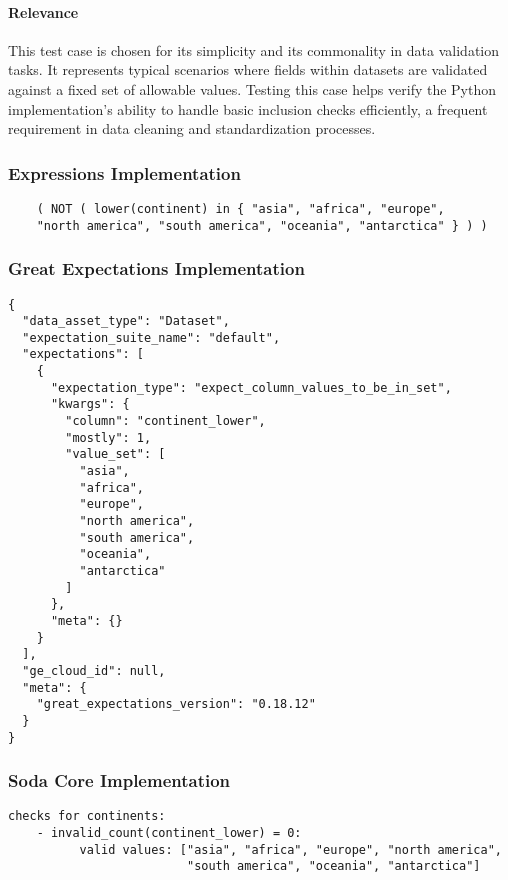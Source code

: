 \paragraph{Relevance} This test case is chosen for its simplicity and its commonality in data validation tasks. It represents typical scenarios where fields within datasets are validated against a fixed set of allowable values. Testing this case helps verify the Python implementation’s ability to handle basic inclusion checks efficiently, a frequent requirement in data cleaning and standardization processes.

\subsubsection{Expressions Implementation}

\begin{verbatim}
    ( NOT ( lower(continent) in { "asia", "africa", "europe", 
    "north america", "south america", "oceania", "antarctica" } ) )
\end{verbatim}

\subsubsection{Great Expectations Implementation}

\begin{verbatim}
{
  "data_asset_type": "Dataset",
  "expectation_suite_name": "default",
  "expectations": [
    {
      "expectation_type": "expect_column_values_to_be_in_set",
      "kwargs": {
        "column": "continent_lower",
        "mostly": 1,
        "value_set": [
          "asia",
          "africa",
          "europe",
          "north america",
          "south america",
          "oceania",
          "antarctica"
        ]
      },
      "meta": {}
    }
  ],
  "ge_cloud_id": null,
  "meta": {
    "great_expectations_version": "0.18.12"
  }
}
\end{verbatim}

\subsubsection{Soda Core Implementation}

\begin{verbatim}
checks for continents:
    - invalid_count(continent_lower) = 0:
          valid values: ["asia", "africa", "europe", "north america", 
                         "south america", "oceania", "antarctica"]
\end{verbatim}


